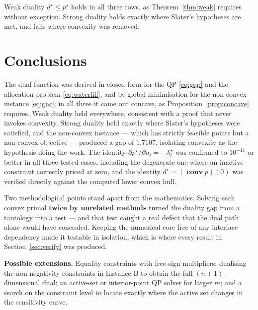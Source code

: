 \documentclass[11pt,a4paper]{article}
\theoremstyle{definition}
\newcommand{\pstar}{p^{\star}}
\newcommand{\dstar}{d^{\star}}
\newcommand{\conv}{\operatorname{\mathbf{conv}}}
\begin{document}
Weak duality $\dstar\le\pstar$ holds in all three rows, as Theorem~\ref{thm:weak} requires
without exception. Strong duality holds exactly where Slater's hypotheses are met, and fails
where convexity was removed.

\section{Conclusions}

The dual function was derived in closed form for the QP \eqref{eq:gqp} and the allocation problem
\eqref{eq:waterfill}, and by global minimisation for the non-convex instance \eqref{eq:gnc}; in
all three it came out concave, as Proposition~\ref{prop:concave} requires. Weak duality held
everywhere, consistent with a proof that never invokes convexity. Strong duality held exactly
where Slater's hypotheses were satisfied, and the non-convex instance --- which has strictly
feasible points but a non-convex objective --- produced a gap of $1.7107$, isolating convexity as
the hypothesis doing the work. The identity
$\partial\pstar/\partial u_{i}=-\lambda_{i}^{\star}$ was confirmed to $10^{-11}$ or better in all
three tested cases, including the degenerate one where an inactive constraint correctly priced at
zero, and the identity $\dstar=(\conv p)(0)$ was verified directly against the computed lower
convex hull.

Two methodological points stand apart from the mathematics. Solving each convex primal
\textbf{twice by unrelated methods} turned the duality gap from a tautology into a test --- and
that test caught a real defect that the dual path alone would have concealed. Keeping the
numerical core free of any interface dependency made it testable in isolation, which is where
every result in Section~\ref{sec:verify} was produced.

\textbf{Possible extensions.} Equality constraints with free-sign multipliers; dualising the
non-negativity constraints in Instance B to obtain the full $(n+1)$-dimensional dual; an
active-set or interior-point QP solver for larger $m$; and a search on the constraint level to
locate exactly where the active set changes in the sensitivity curve.
\end{document}
